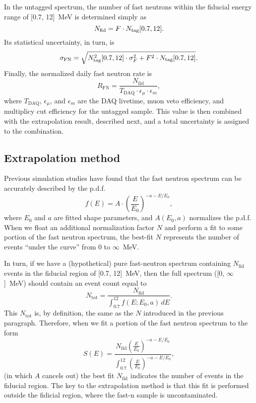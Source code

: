 \documentclass[../thesis.tex]{subfiles}
\begin{document}
\def\nfn{\ensuremath{N_\mathrm{fid}}} \def\rfn{\ensuremath{R_\mathrm{FN}}}

In the untagged spectrum, the number of fast neutrons within the fiducial energy
range of [0.7, 12]~MeV is determined simply as
\[ \nfn = F \cdot \ntag[0.7, 12]. \] Its statistical uncertainty, in turn, is
\begin{equation}
  \label{eq:fastn_scal_unc}
  \sigma_\mathrm{FN} = \sqrt{N_\mathrm{tag}^2[0.7, 12]
    \cdot \sigma_F^2 + F^2 \cdot N_\mathrm{tag}[0.7, 12]}.
\end{equation}
Finally, the normalized daily fast neutron rate is
\begin{equation}
  \label{eq:fastn_rate}
  \rfn = \frac{\nfn}{T_\mathrm{DAQ} \cdot \epsilon_\mu \cdot \epsilon_m},
\end{equation}
where $T_\mathrm{DAQ}$, $\epsilon_\mu$, and $\epsilon_m$ are the DAQ livetime,
muon veto efficiency, and multiplicy cut efficiency for the untagged
sample. This value is then combined with the extrapolation result, described
next, and a total uncertainty is assigned to the combination.

\subsection{Extrapolation method}
\label{sec:fastn_extrap}

Previous simulation studies have found that the fast neutron spectrum can be
accurately described by the p.d.f.
\[ f(E) = A \cdot \left( \frac{E}{E_0} \right)^{-a-E/E_0}, \] where $E_0$ and
$a$ are fitted shape parameters, and $A(E_0, a)$ normalizes the p.d.f. When we
float an additional normalization factor $N$ and perform a fit to some portion
of the fast neutron spectrum, the best-fit $N$ represents the number of events
``under the curve'' from 0 to $\infty$~MeV.

In turn, if we have a (hypothetical) pure fast-neutron spectrum containing
$N_\mathrm{fid}$ events in the fiducial region of [0.7, 12]~MeV, then the full
spectrum ([0, $\infty$]~MeV) should contain an event count equal to
\[ N_\mathrm{tot} = \frac{N_\mathrm{fid}}{\int_{0.7}^{12} f(E; E_0, a)\,dE }. \]
This $N_\mathrm{tot}$ is, by definition, the same as the $N$ introduced in the
previous paragraph. Therefore, when we fit a portion of the fast neutron
spectrum to the form
\begin{equation}
  \label{eq:fastn_extrap_form}
  S(E) = \frac{N_\mathrm{fid} \left( \frac{E}{E_0} \right)^{-a-E/E_0}}
  {\int_{0.7}^{12} \left( \frac{E}{E_0} \right)^{-a-E/E_0} },
\end{equation}
(in which $A$ cancels out) the best fit $N_\mathrm{fid}$ indicates the number of
events in the fiducial region. The key to the extrapolation method is that this
fit is performed outside the fidicial region, where the fast-n sample is
uncontaminated.
\end{document}
